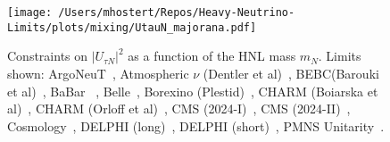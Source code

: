\documentclass{revtex4-1}%
\begin{document}
\begin{figure}[h!]%
\centering%
\texttt{[image: /Users/mhostert/Repos/Heavy-Neutrino-Limits/plots/mixing/UtauN\_majorana.pdf]}%
\caption{Constraints on $|U_{\tau N}|^2$ as a function of the HNL mass $m_N$. Limits shown: ArgoNeuT~\cite{ArgoNeuT:2021clc}, Atmospheric $\nu$ (Dentler et al)~\cite{Dentler:2018sju}, BEBC(Barouki et al)~\cite{Barouki:2022bkt}, BaBar ~\cite{BaBar:2022cqj}, Belle~\cite{Belle:2024wyk}, Borexino (Plestid)~\cite{Plestid:2020ssy}, CHARM (Boiarska et al)~\cite{Boiarska:2021yho}, CHARM (Orloff et al)~\cite{Orloff:2002de}, CMS (2024-I)~\cite{CMS:2024ake}, CMS (2024-II)~\cite{CMS:2024xdq}, Cosmology~\cite{Sabti:2020yrt}, DELPHI (long)~\cite{DELPHI:1996qcc}, DELPHI (short)~\cite{DELPHI:1996qcc}, PMNS Unitarity~\cite{Blennow:2023mqx}.}%
\end{figure}

%
%
%
\end{document}
